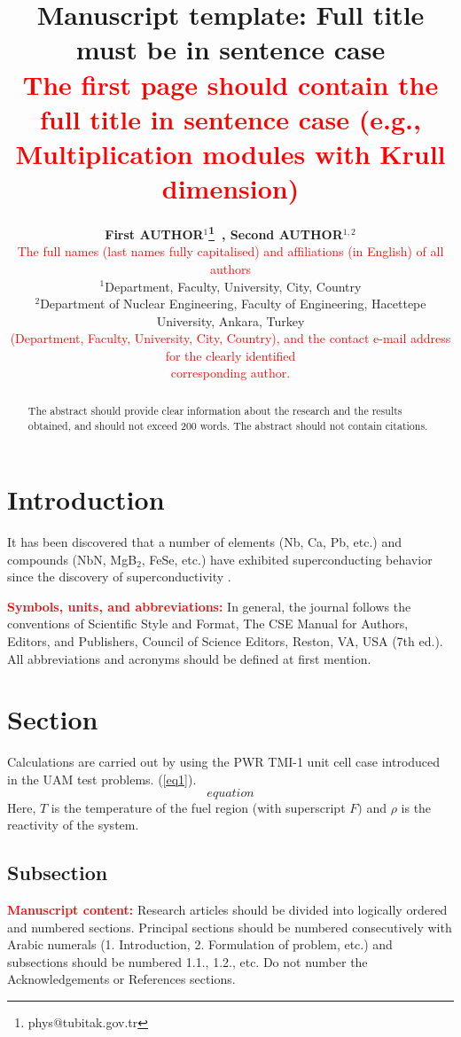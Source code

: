 \documentclass{fizik}
\title{Manuscript template: Full title must be in sentence case \\
\textcolor{red}{\footnotesize  The first page should contain the full title in sentence case (e.g., Multiplication modules with Krull dimension)}}
\author[AUTHOR and AUTHOR]{
\textbf{First AUTHOR$^{1}$\thanks{phys@tubitak.gov.tr}~\href{https://orcid.org/XXXX-XXXX-XXXX-XXXX}{}, 
Second AUTHOR$^{1,2}$\href{https://orcid.org/XXXX-XX12-3456-789X}{}}\\
\textcolor{red}{The
full names (last names fully capitalised) and affiliations (in English) of all authors}\\ 
$^{1}$Department, Faculty, University, City, Country\\
$^{2}$Department of Nuclear Engineering, Faculty of Engineering, Hacettepe 
University, Ankara, Turkey\\
\textcolor{red}{(Department, Faculty, University, City,
Country), and the contact e-mail address for the clearly identified}\\
\textcolor{red}{corresponding author.}
\\ [1.8em]


\rec{.201}
\acc{.201}
\finv{..201}
}
\begin{document}
\maketitle


\begin{abstract}The abstract should provide clear information about the research and the results obtained, and should not exceed 200 words. The abstract should not contain citations.

\end{abstract}


\section{Introduction}

It has been discovered that a number of elements (Nb, Ca, Pb, etc.) and 
compounds (NbN, MgB$_{2}$, FeSe, etc.) have exhibited superconducting 
behavior since the discovery of superconductivity \cite{1}.

\textcolor{red}{\textbf{Symbols, units, and abbreviations:}} In general, the journal follows the conventions of Scientific Style and Format, The
CSE Manual for Authors, Editors, and Publishers, Council of Science Editors, Reston, VA, USA (7th ed.). All abbreviations
and acronyms should be defined at first mention.

\section{Section}
Calculations are carried out by using the PWR TMI-1 unit cell case 
introduced in the UAM test problems. (\ref{eq1}).
\begin{equation}
\label{eq1}
equation
\end{equation}
Here, $T$ is the temperature of the fuel region (with superscript $F)$ and $\rho $ 
is the reactivity of the system.

\subsection{Subsection}

\textcolor{red}{\textbf{Manuscript content:}} Research articles should be divided into logically ordered and numbered sections. Principal
sections should be numbered consecutively with Arabic numerals (1. Introduction, 2. Formulation of problem, etc.) and
subsections should be numbered 1.1., 1.2., etc. Do not number the Acknowledgements or References sections.
\end{document}
